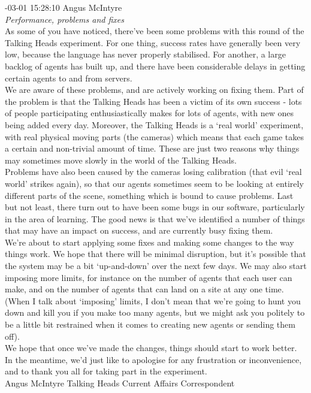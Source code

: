 \begin{mail}

{-03-01 15:28:10 Angus McIntyre}\\
{\itshape Performance, problems and fixes}\\
As some of you have noticed, there've been some problems with this round of the Talking Heads experiment. For one thing, success rates have generally been very low, because the language has never properly stabilised. For another, a large backlog of agents has built up, and there have been considerable delays in getting certain agents to and from servers.\\
We are aware of these problems, and are actively working on fixing them. Part of the problem is that the Talking Heads has been a victim of its own success - lots of people participating enthusiastically makes for lots of agents, with new ones being added every day. Moreover, the Talking Heads is a `real world' experiment, with real physical moving parts (the cameras) which means that each game takes a certain and non-trivial amount of time. These are just two reasons why things may sometimes move slowly in the world of the Talking Heads.\\
Problems have also been caused by the cameras losing calibration (that evil `real world' strikes again), so that our agents sometimes seem to be looking at entirely different parts of the scene, something which is bound to cause problems. Last but not least, there turn out to have been some bugs in our software, particularly in the area of learning. The good news is that we've identified a number of things that may have an impact on success, and are currently busy fixing them.\\
We're about to start applying some fixes and making some changes to the way things work. We hope that there will be minimal disruption, but it's possible that the system may be a bit `up-and-down' over the next few days. We may also start imposing more limits, for instance on the number of agents that each user can make, and on the number of agents that can land on a site at any one time. (When I talk about `imposing' limits, I don't mean that we're going to hunt you down and kill you if you make too many agents, but we might ask you politely to be a little bit restrained when it comes to creating new agents or sending them off). \\
We hope that once we've made the changes, things should start to work better. In the meantime, we'd just like to apologise for any frustration or inconvenience, and to thank you all for taking part in the experiment. \\
  Angus McIntyre
  Talking Heads Current Affairs Correspondent \\


\end{mail}
